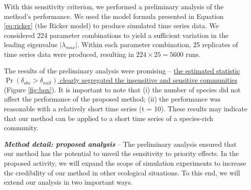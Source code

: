 \documentclass[12pt, class=article, crop=false]{standalone}
\begin{document}

With this sensitivity criterion, we performed a preliminary analysis of the method's performance. We used the model formula presented in Equation \ref{eq:ricker} (the Ricker model) to produce simulated time series data. We considered 224 parameter combinations to yield a sufficient variation in the leading eigenvalue $|\lambda_{max}|$. Within each parameter combination, 25 replicates of time series data were produced, resulting in $224 \times 25 = 5600$ runs.

The results of the preliminary analysis were promising -- \ul{the estimated statistic $\Pr(\delta_{obs} > \delta_{null})$ clearly segregated the insensitive and sensitive communities} (Figure \ref{fig:box}). It is important to note that (i) the number of species did not affect the performance of the proposed method; (ii) the performance was reasonable with a relatively short time series (t = 10). These results may indicate that our method can be applied to a short time series of a species-rich community. 

\textbf{\textit{Method detail: proposed analysis}} -- 
The preliminary analysis ensured that our method has the potential to unveil the sensitivity to priority effects.
In the proposed activity, we will expand the scope of simulation experiments to increase the credibility of our method in other ecological situations.
To this end, we will extend our analysis in two important ways.
\end{document}
